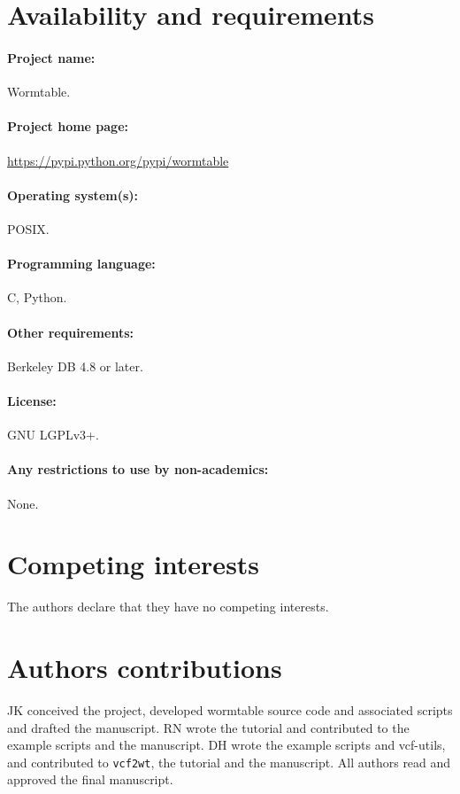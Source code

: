 \documentclass[10pt]{bmc_article}
\newenvironment{bmcformat}{\begin{raggedright}\baselineskip20pt\sloppy\setboolean{publ}{false}}{\end{raggedright}\baselineskip20pt\sloppy}
\begin{document}
\begin{bmcformat}
  
\section*{Availability and requirements}
\paragraph{Project name:} Wormtable.
\paragraph{Project home page:}\url{https://pypi.python.org/pypi/wormtable}
\paragraph{Operating system(s):} POSIX.
\paragraph{Programming language:} C, Python.
\paragraph{Other requirements:} Berkeley DB 4.8 or later.
\paragraph{License:} GNU LGPLv3+.
\paragraph{Any restrictions to use by non-academics:} None.

\section*{Competing interests}
The authors declare that they have no competing interests.

    
\section*{Authors contributions}
JK conceived the project, developed wormtable source code and associated
scripts and drafted the manuscript. RN wrote the tutorial and contributed to
the example scripts and the manuscript. DH wrote the example scripts and vcf-utils,
and contributed to \texttt{vcf2wt}, the tutorial and the manuscript.
All authors read and approved the final manuscript.



\end{bmcformat}
\end{document}
